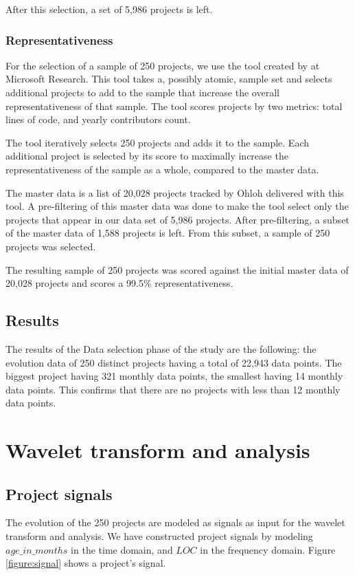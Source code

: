 After this selection, a set of 5,986 projects is left.

\subsubsection{Representativeness}
For the selection of a sample of 250 projects, we use the tool created by
\citet{nagappan} at Microsoft Research. This tool takes a, possibly atomic,
sample set and selects additional projects to add to the sample that increase
the overall representativeness of that sample. The tool scores projects by two
metrics: total lines of code, and yearly contributors count.

The tool iteratively selects 250 projects and adds it to the sample. Each
additional project is selected by its score to maximally increase the
representativeness of the sample as a whole, compared to the master data.

The master data is a list of 20,028 projects tracked by Ohloh delivered with
this tool. A pre-filtering of this master data was done to make the tool select
only the projects that appear in our data set of 5,986 projects. After
pre-filtering, a subset of the master data of 1,588 projects is left. From this
subset, a sample of 250 projects was selected.

The resulting sample of 250 projects was scored against the initial master data
of 20,028 projects and scores a 99.5\% representativeness.

\subsection{Results}
The results of the Data selection phase of the study are the following: the
evolution data of 250 distinct projects having a total of 22,943 data points.
The biggest project having 321 monthly data points, the smallest having 14
monthly data points. This confirms that there are no projects with less
than 12 monthly data points.

\section{Wavelet transform and analysis}
\subsection{Project signals}
The evolution of the 250 projects are modeled as signals as input for the
wavelet transform and analysis. We have constructed project signals by modeling
$age\_in\_months$ in the time domain, and $LOC$ in the frequency domain. Figure
\ref{figure:signal} shows a project's signal.

